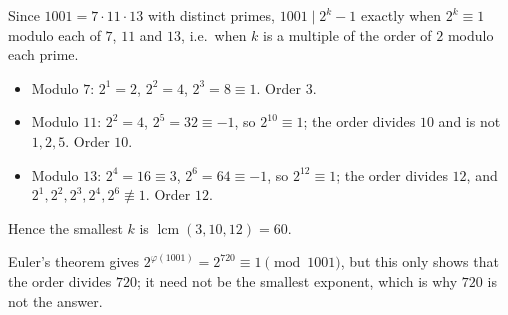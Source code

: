 Since $1001=7\cdot11\cdot13$ with distinct primes, $1001\mid 2^k-1$ exactly when $2^k\equiv1$ modulo each of $7$, $11$ and $13$, i.e.\ when $k$ is a multiple of the order of $2$ modulo each prime.
\begin{itemize}
\item Modulo $7$: $2^1=2$, $2^2=4$, $2^3=8\equiv1$. Order $3$.
\item Modulo $11$: $2^2=4$, $2^5=32\equiv-1$, so $2^{10}\equiv1$; the order divides $10$ and is not $1,2,5$. Order $10$.
\item Modulo $13$: $2^4=16\equiv3$, $2^6=64\equiv-1$, so $2^{12}\equiv1$; the order divides $12$, and $2^1,2^2,2^3,2^4,2^6\not\equiv1$. Order $12$.
\end{itemize}
Hence the smallest $k$ is $\operatorname{lcm}(3,10,12)=\boxed{60}$.

Euler's theorem gives $2^{\varphi(1001)}=2^{720}\equiv1\pmod{1001}$, but this only shows that the order divides $720$; it need not be the smallest exponent, which is why $720$ is not the answer.
